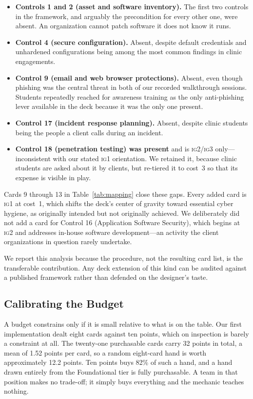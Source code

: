 \documentclass[10pt,twocolumn,letterpaper]{article}
\newcommand{\ig}[1]{\textsc{ig#1}}
\begin{document}
\begin{itemize}
\item \textbf{Controls 1 and 2 (asset and software inventory).} The first two
controls in the framework, and arguably the precondition for every other one,
were absent. An organization cannot patch software it does not know it runs.
\item \textbf{Control 4 (secure configuration).} Absent, despite default
credentials and unhardened configurations being among the most common findings
in clinic engagements.
\item \textbf{Control 9 (email and web browser protections).} Absent, even
though phishing was the central threat in both of our recorded walkthrough
sessions. Students repeatedly reached for awareness training as the only
anti-phishing lever available in the deck because it was the only one present.
\item \textbf{Control 17 (incident response planning).} Absent, despite clinic
students being the people a client calls during an incident.
\item \textbf{Control 18 (penetration testing) was present} and is \ig{2}/\ig{3}
only---inconsistent with our stated \ig{1} orientation. We retained it, because
clinic students are asked about it by clients, but re-tiered it to cost~3 so
that its expense is visible in play.
\end{itemize}

Cards 9 through 13 in Table~\ref{tab:mapping} close these gaps. Every added card
is \ig{1} at cost~1, which shifts the deck's center of gravity toward essential
cyber hygiene, as originally intended but not originally achieved. We
deliberately did not add a card for Control 16 (Application Software Security),
which begins at \ig{2} and addresses in-house software development---an activity
the client organizations in question rarely undertake.

We report this analysis because the procedure, not the resulting card list, is
the transferable contribution. Any deck extension of this kind can be audited
against a published framework rather than defended on the designer's taste.

\subsection{Calibrating the Budget}
\label{sec:budget}

A budget constrains only if it is small relative to what is on the table. Our
first implementation dealt eight cards against ten points, which on inspection
is barely a constraint at all. The twenty-one purchasable cards carry 32 points
in total, a mean of 1.52 points per card, so a random eight-card hand is worth
approximately 12.2 points. Ten points buys 82\% of such a hand, and a hand drawn
entirely from the Foundational tier is fully purchasable. A team in that
position makes no trade-off; it simply buys everything and the mechanic teaches
nothing.
\end{document}
